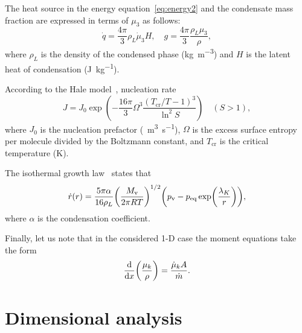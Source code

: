 \documentclass{article}
\newcommand{\vap}{\text{v}}
\newcommand{\eq}{\text{eq}}
\newcommand{\crit}[2][]{#2_\text{cr#1}}
\begin{document}
The heat source in the energy equation~\eqref{eq:energy2}
and the condensate mass fraction are expressed in terms of $\mu_3$ as follows:
\begin{equation}\label{eq:dotq-g}
     \dot{q} = \frac{4\pi}{3}\rho_L\dot{\mu}_3H, \quad g = \frac{4\pi}{3} \frac{\rho_L\mu_3}{\rho},
\end{equation}
where $\rho_L$ is the density of the condensed phase (\si{\kg\per\cubic\m})
and $H$ is the latent heat of condensation (\si{\J\per\kg}).

According to the Hale model~\cite{hale2004scaling}, nucleation rate
\begin{equation}\label{eq:J}
    J = J_0\exp(-\frac{16\pi}{3}\Omega^3\frac{(\crit{T}/T-1)^3}{\ln^2{S}}) \quad (S > 1),
\end{equation}
where $J_0$ is the nucleation prefactor (\si{\per\cubic\m\per\s}),
$\Omega$ is the excess surface entropy per molecule divided by the Boltzmann constant,
and $\crit{T}$ is the critical temperature (\si{\K}).

The isothermal growth law~\cite{sinha2009modeling} states that
\begin{equation}\label{eq:dotr}
    \dot{r}(r) = \frac{5\pi\alpha}{16\rho_L}
        \qty(\frac{M_\vap}{2\pi RT})^{1/2} \qty(p_\vap-p_\eq\exp(\frac{\lambda_K}{r})),
\end{equation}
where $\alpha$ is the condensation coefficient.

Finally, let us note that in the considered 1-D case the moment equations take the form
\begin{equation}\label{eq:moments}
    \dv{x}(\frac{\mu_k}{\rho}) = \frac{\dot{\mu}_kA}{\dot{m}}.
\end{equation}

\section{Dimensional analysis}
\end{document}
